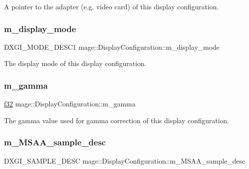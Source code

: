A pointer to the adapter (e.\+g. video card) of this display configuration. \hypertarget{structmage_1_1_display_configuration_ac59d5e7c5553ef4842090bf1a83bd7ca}{}\label{structmage_1_1_display_configuration_ac59d5e7c5553ef4842090bf1a83bd7ca} 
\subsubsection{\texorpdfstring{m\+\_\+display\+\_\+mode}{m\_display\_mode}}
{\footnotesize\ttfamily D\+X\+G\+I\+\_\+\+M\+O\+D\+E\+\_\+\+D\+E\+S\+C1 mage\+::\+Display\+Configuration\+::m\+\_\+display\+\_\+mode\hspace{0.3cm}{\ttfamily [private]}}

The display mode of this display configuration. \hypertarget{structmage_1_1_display_configuration_affa90cc88657b8fa52a4d98844cbdd97}{}\label{structmage_1_1_display_configuration_affa90cc88657b8fa52a4d98844cbdd97} 
\subsubsection{\texorpdfstring{m\+\_\+gamma}{m\_gamma}}
{\footnotesize\ttfamily \hyperlink{namespacemage_a6a44ad388483959dc4dff9f2aef91431}{f32} mage\+::\+Display\+Configuration\+::m\+\_\+gamma\hspace{0.3cm}{\ttfamily [private]}}

The gamma value used for gamma correction of this display configuration. \hypertarget{structmage_1_1_display_configuration_a1d4de267f8edcd0044252b9658f426c3}{}\label{structmage_1_1_display_configuration_a1d4de267f8edcd0044252b9658f426c3} 
\subsubsection{\texorpdfstring{m\+\_\+\+M\+S\+A\+A\+\_\+sample\+\_\+desc}{m\_MSAA\_sample\_desc}}
{\footnotesize\ttfamily D\+X\+G\+I\+\_\+\+S\+A\+M\+P\+L\+E\+\_\+\+D\+E\+SC mage\+::\+Display\+Configuration\+::m\+\_\+\+M\+S\+A\+A\+\_\+sample\+\_\+desc\hspace{0.3cm}{\ttfamily [private]}}

